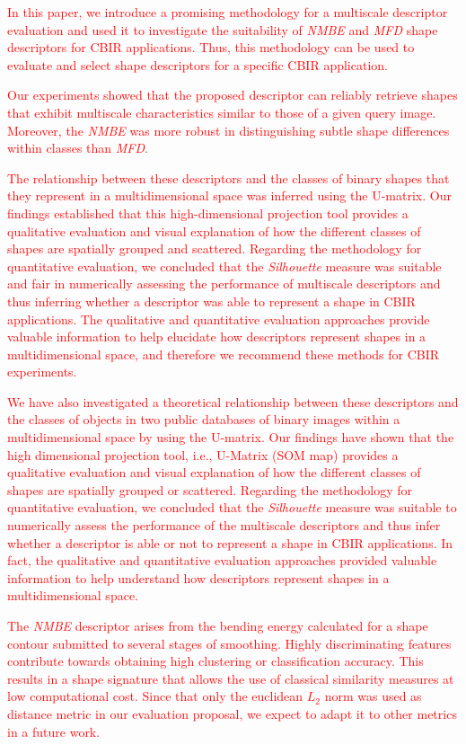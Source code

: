 \textcolor{red}{
In this paper, we introduce a promising methodology for a multiscale descriptor evaluation and used it to investigate the suitability of \emph{NMBE} and \emph{MFD} shape descriptors for CBIR applications. Thus, 
this methodology can be used to evaluate and select shape descriptors for a specific CBIR application.

Our experiments showed that the proposed descriptor can reliably retrieve shapes that exhibit multiscale characteristics similar to those of a given query image. Moreover, the \emph{NMBE} was more robust in distinguishing subtle shape differences within classes than \emph{MFD}.

The relationship between these descriptors and the classes of binary shapes that they represent in a multidimensional space was inferred using the U-matrix. Our findings established that this high-dimensional projection tool provides a qualitative evaluation and visual explanation of how the different classes of shapes are spatially grouped and scattered. Regarding the methodology for quantitative evaluation,  we concluded that the \emph{Silhouette} measure was suitable and fair in numerically assessing the performance of multiscale descriptors and thus inferring  whether a descriptor was able to represent a shape in CBIR applications. 
The qualitative and quantitative evaluation approaches provide valuable information to help elucidate how descriptors represent shapes in a multidimensional space, and therefore we recommend these methods for CBIR experiments.


We have also investigated  a theoretical relationship between these descriptors and the classes of objects in two public databases of binary images within a multidimensional space by using the U-matrix. Our findings have shown that the high dimensional projection tool, i.e., U-Matrix (SOM map) provides a qualitative evaluation and visual explanation of how the different classes of shapes are spatially grouped or scattered. Regarding the methodology for quantitative evaluation,  we concluded that the \emph{Silhouette} measure was suitable to numerically assess the performance of the multiscale descriptors and thus infer  whether a descriptor is able or not to represent a shape in CBIR applications. 
In fact, the qualitative and quantitative evaluation approaches provided valuable information to help understand how descriptors represent shapes in a multidimensional space.


The \emph{NMBE} descriptor arises from the bending energy calculated for a shape contour submitted to several stages of smoothing.  Highly discriminating features contribute towards obtaining high clustering or classification accuracy.\color{black} 
This results in a shape signature that allows the use of classical similarity measures at low computational cost.
Since that only the euclidean $L_2$ norm was used as distance metric in our evaluation proposal, we expect to adapt it to other metrics in a future work. 

}
